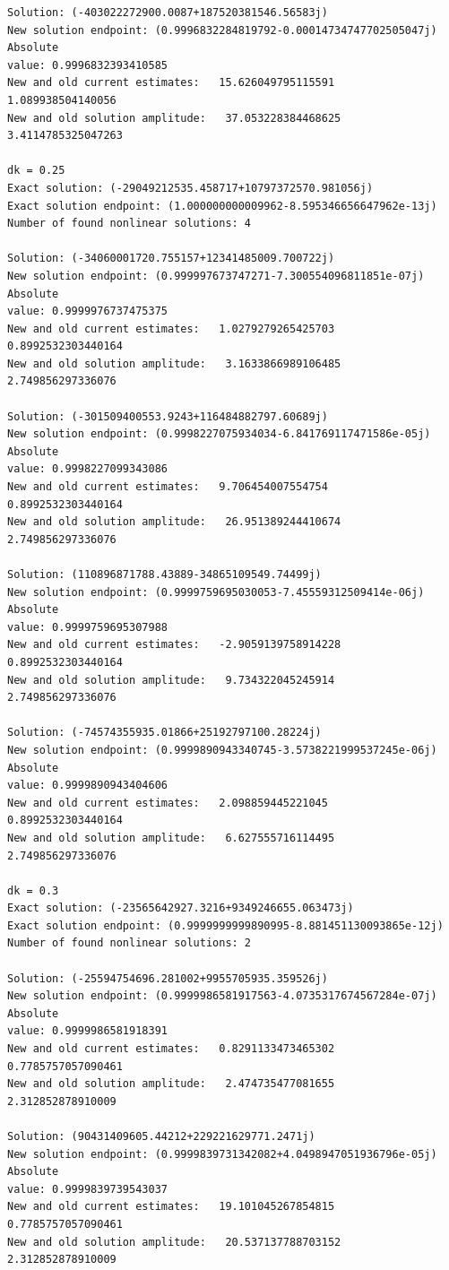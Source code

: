 \documentclass[11pt]{article}
\begin{document}
\begin{Verbatim}[commandchars=\\\{\}]
Solution: (-403022272900.0087+187520381546.56583j)
New solution endpoint: (0.9996832284819792-0.00014734747702505047j) Absolute
value: 0.9996832393410585
New and old current estimates:   15.626049795115591    1.089938504140056
New and old solution amplitude:   37.053228384468625    3.4114785325047263

dk = 0.25
Exact solution: (-29049212535.458717+10797372570.981056j)
Exact solution endpoint: (1.000000000009962-8.595346656647962e-13j)
Number of found nonlinear solutions: 4

Solution: (-34060001720.755157+12341485009.700722j)
New solution endpoint: (0.999997673747271-7.300554096811851e-07j) Absolute
value: 0.9999976737475375
New and old current estimates:   1.0279279265425703    0.8992532303440164
New and old solution amplitude:   3.1633866989106485    2.749856297336076

Solution: (-301509400553.9243+116484882797.60689j)
New solution endpoint: (0.9998227075934034-6.841769117471586e-05j) Absolute
value: 0.9998227099343086
New and old current estimates:   9.706454007554754    0.8992532303440164
New and old solution amplitude:   26.951389244410674    2.749856297336076

Solution: (110896871788.43889-34865109549.74499j)
New solution endpoint: (0.9999759695030053-7.45559312509414e-06j) Absolute
value: 0.9999759695307988
New and old current estimates:   -2.9059139758914228    0.8992532303440164
New and old solution amplitude:   9.734322045245914    2.749856297336076

Solution: (-74574355935.01866+25192797100.28224j)
New solution endpoint: (0.9999890943340745-3.5738221999537245e-06j) Absolute
value: 0.9999890943404606
New and old current estimates:   2.098859445221045    0.8992532303440164
New and old solution amplitude:   6.627555716114495    2.749856297336076

dk = 0.3
Exact solution: (-23565642927.3216+9349246655.063473j)
Exact solution endpoint: (0.9999999999890995-8.881451130093865e-12j)
Number of found nonlinear solutions: 2

Solution: (-25594754696.281002+9955705935.359526j)
New solution endpoint: (0.9999986581917563-4.0735317674567284e-07j) Absolute
value: 0.9999986581918391
New and old current estimates:   0.8291133473465302    0.7785757057090461
New and old solution amplitude:   2.474735477081655    2.312852878910009

Solution: (90431409605.44212+229221629771.2471j)
New solution endpoint: (0.9999839731342082+4.0498947051936796e-05j) Absolute
value: 0.9999839739543037
New and old current estimates:   19.101045267854815    0.7785757057090461
New and old solution amplitude:   20.537137788703152    2.312852878910009


\end{Verbatim}
\end{document}
